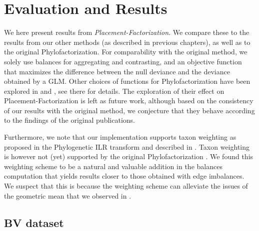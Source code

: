 \section{Evaluation and Results}
\label{ch:Factorization:sec:Evaluation}

We here present results from \emph{Placement-Factorization}. %
We compare these to the results from our other methods (as described in previous chapters), as well as to the original Phylofactorization.
For comparability with the original method, we solely use balances for aggregating and contrasting,
and an objective function that maximizes the difference between the null deviance and the deviance obtained by a \acf{GLM}.
Other choices of functions for Phylofactorization have been explored in  and ,
see there for details.
The exploration of their effect on Placement-Factorization is left as future work,
although based on the consistency of our results with the original method,
we conjecture that they behave according to the findings of the original publications.

Furthermore, we note that our implementation supports taxon weighting
as proposed in the Phylogenetic ILR transform \cite{Silverman2017} and described in .
Taxon weighting is however not (yet) supported by the original Phylofactorization \cite{Washburne2017a}.
We found this weighting scheme to be a natural and valuable addition in the balances computation
that yields results closer to those obtained with edge imbalances.
We suspect that this is because the weighting scheme can alleviate the issues of the geometric mean
that we observed in .



\subsection{BV dataset}
\label{ch:Factorization:sec:Evaluation:sub:BVDataset}

